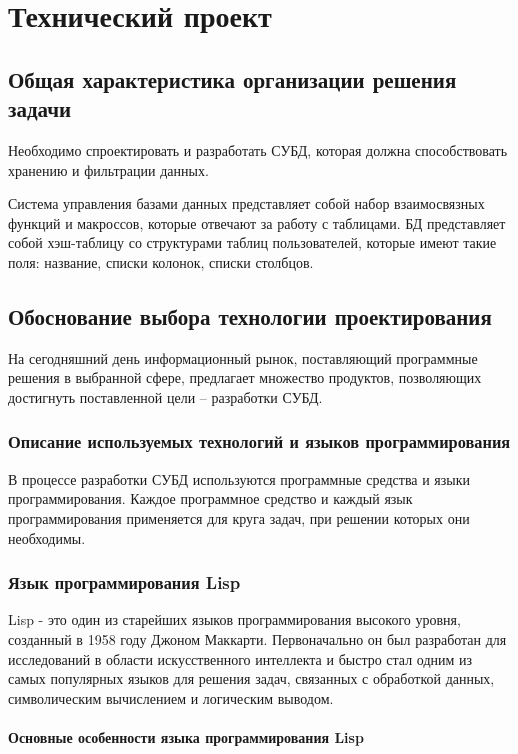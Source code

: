 \section{Технический проект}
\subsection{Общая характеристика организации решения задачи}

Необходимо спроектировать и разработать СУБД, которая должна способствовать хранению и фильтрации данных.

Система управления базами данных представляет собой набор взаимосвязных функций и макроссов, которые отвечают за работу с таблицами. БД представляет собой хэш-таблицу со структурами таблиц пользователей, которые имеют такие поля: название, списки колонок, списки столбцов.

\subsection{Обоснование выбора технологии проектирования}

На сегодняшний день информационный рынок, поставляющий программные решения в выбранной сфере, предлагает множество продуктов, позволяющих достигнуть поставленной цели – разработки СУБД.

\subsubsection{Описание используемых технологий и языков программирования}

В процессе разработки СУБД используются программные средства и языки программирования. Каждое программное средство и каждый язык программирования применяется для круга задач, при решении которых они необходимы.

\subsubsection{Язык программирования Lisp}

Lisp - это один из старейших языков программирования высокого уровня, созданный в 1958 году Джоном Маккарти. Первоначально он был разработан для исследований в области искусственного интеллекта и быстро стал одним из самых популярных языков для решения задач, связанных с обработкой данных, символическим вычислением и логическим выводом.

\paragraph{Основные особенности языка программирования Lisp}

